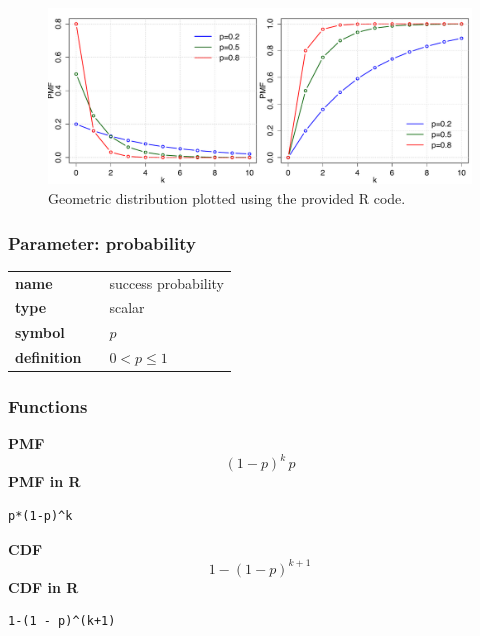 \begin{figure}[ht!]
\centering
  \includegraphics[width=140mm]{pics/Geometric.pdf}
 \caption{Geometric distribution plotted using the provided R code.}
 \label{fig:Geometric}
\end{figure}

\subsubsection*{Parameter: probability}

\noindent\begin{tabular}{p{2cm}cl}
\textbf{name} & & success probability \\
\textbf{type} & & scalar \\
\textbf{symbol} & & $p$  \\
\textbf{definition} & & $0< p \leq 1$
\end{tabular}
\subsubsection*{Functions}

\smallskip \noindent \hspace{.2cm} \textbf{PMF} 
\begin{equation*}(1 - p)^k\,p\end{equation*}
\smallskip \noindent \hspace{.2cm} \textbf{PMF in R}  
\begin{verbatim}p*(1-p)^k\end{verbatim}
\smallskip \noindent \hspace{.2cm} \textbf{CDF} 
\begin{equation*}1-(1 - p)^{k+1}\end{equation*}
\smallskip \noindent \hspace{.2cm} \textbf{CDF in R} 
\begin{verbatim}1-(1 - p)^(k+1)\end{verbatim}
\smallskip
